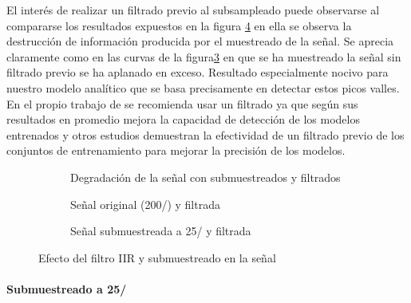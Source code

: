 \iffalse
\fi

El interés de realizar un filtrado previo al subsampleado puede observarse al compararse los resultados expuestos en la figura \ref{fig:iir} en ella se observa la destrucción de información producida por el muestreado de la señal. Se aprecia claramente como en las curvas de la figura\ref{fig:signalIIRFilter25} en que se ha muestreado la señal sin filtrado previo se ha aplanado en exceso. Resultado especialmente nocivo para nuestro modelo analítico que se basa precisamente en detectar estos picos valles. En el propio trabajo de  se recomienda usar un filtrado ya que según sus resultados en promedio mejora la capacidad de detección de los modelos entrenados y otros estudios \cite{Xiao2016,Tian2019,Liu2020} demuestran la efectividad de un filtrado previo de los conjuntos de entrenamiento para mejorar la precisión de los modelos.

\begin{figure}[htb!]
  \centering
  \begin{subfigure}[b]{0.96\textwidth}
      \centering
      \caption{\footnotesize Degradación de la señal con submuestreados y filtrados}
      \label{fig:downsample}
  \end{subfigure}
  \centering

  \begin{subfigure}[b]{0.48\textwidth}
      \centering
      \caption{\footnotesize Señal original (200\hz/) y filtrada}
      \label{fig:signalIIRFilter}
  \end{subfigure}
  \hfill
  \begin{subfigure}[b]{0.48\textwidth}
      \centering
      \caption{\footnotesize Señal submuestreada a 25\hz/ y filtrada}
      \label{fig:signalIIRFilter25}
  \end{subfigure}
  \caption{\footnotesize \label{fig:iir}  Efecto del filtro IIR y submuestreado en la señal}
\end{figure}

\paragraph{Submuestreado a 25\hz/}

